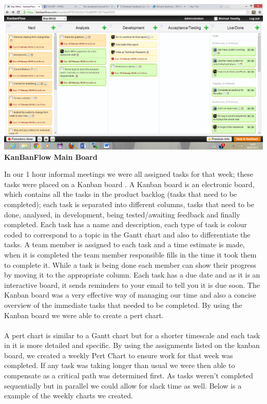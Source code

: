 \documentclass[10pt,a4paper]{article}
\begin{document}
\begin{center}
\includegraphics[scale=0.3]{kb.png}
\textbf{KanBanFlow Main Board}
\end{center}
In our 1 hour informal meetings we were all assigned tasks for that week; these tasks were placed on a Kanban board \cite{kb}. A Kanban board is an electronic board, which contains all the tasks in the product backlog (tasks that need to be completed); each task is separated into different columns, tasks that need to be done, analysed, in development, being tested/awaiting feedback and finally completed. Each task has a name and description, each type of task is colour coded to correspond to a topic in the Gantt chart and also to differentiate the tasks. A team member is assigned to each task and a time estimate is made, when it is completed the team member responsible fills in the time it took them to complete it. While a task is being done each member can show their progress by moving it to the appropriate column. Each task has a due date and as it is an interactive board, it sends reminders to your email to tell you it is due soon. The Kanban board was a very effective way of managing our time and also a concise overview of the immediate tasks that needed to be completed. By using the Kanban board we were able to create a pert chart. \\
\\
 A pert chart is similar to a Gantt chart but for a shorter timescale and each task in it is more detailed and specific. By using the assignments listed on the kanban board, we created a weekly Pert Chart to ensure work for that week was completed. If any task was taking longer than usual we were then able to compensate as a critical path was determined first. As tasks weren’t completed sequentially but in parallel we could allow for slack time as well. Below is a example of the weekly charts we created.\\
\end{document}
